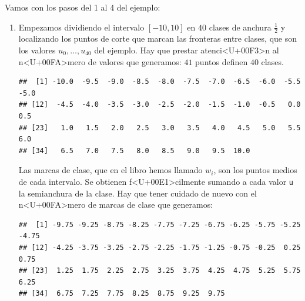 \documentclass[10pt,a4paper]{article}
\begin{document}
Vamos con los pasos del 1 al 4 del ejemplo:
\begin{enumerate}

\item Empezamos dividiendo el intervalo $[-10, 10]$ en $40$ clases de anchura $\frac{1}{2}$ y localizando los puntos de corte que marcan las fronteras entre clases, que son los valores $u_0, \ldots, u_{40}$ del ejemplo. Hay que prestar atenci<U+00F3>n al n<U+00FA>mero de valores que generamos: $41$ puntos definen $40$ clases.

\begin{knitrout}
\color{fgcolor}\begin{kframe}
\begin{alltt}
 \hlkwb{=} \hlopt{-}
 \hlkwb{=}  
 \hlkwb{=} 
 \hlkwb{=} \hlstd{(}   \hlopt{+} \hlstd{)))} 
\end{alltt}
\begin{verbatim}
##  [1] -10.0  -9.5  -9.0  -8.5  -8.0  -7.5  -7.0  -6.5  -6.0  -5.5  -5.0
## [12]  -4.5  -4.0  -3.5  -3.0  -2.5  -2.0  -1.5  -1.0  -0.5   0.0   0.5
## [23]   1.0   1.5   2.0   2.5   3.0   3.5   4.0   4.5   5.0   5.5   6.0
## [34]   6.5   7.0   7.5   8.0   8.5   9.0   9.5  10.0
\end{verbatim}
\end{kframe}
\end{knitrout}

Las marcas de clase, que en el libro hemos llamado $w_i$, son los puntos medios de cada intervalo. Se obtienen f<U+00E1>cilmente sumando a cada valor {\tt u} la semianchura de la clase. Hay que tener cuidado de nuevo con el n<U+00FA>mero de marcas de clase que generamos:
\begin{knitrout}
\color{fgcolor}\begin{kframe}
\begin{alltt}
 \hlkwb{=}   \hlopt{+}  \hlopt{-}  \hlopt{/} \hlstd{(} \hlopt{*} \hlstd{numClases)))[}\hlopt{:}\hlstd{numClases])}
\end{alltt}
\begin{verbatim}
##  [1] -9.75 -9.25 -8.75 -8.25 -7.75 -7.25 -6.75 -6.25 -5.75 -5.25 -4.75
## [12] -4.25 -3.75 -3.25 -2.75 -2.25 -1.75 -1.25 -0.75 -0.25  0.25  0.75
## [23]  1.25  1.75  2.25  2.75  3.25  3.75  4.25  4.75  5.25  5.75  6.25
## [34]  6.75  7.25  7.75  8.25  8.75  9.25  9.75
\end{verbatim}
\end{kframe}
\end{knitrout}


\end{enumerate}
\end{document}
